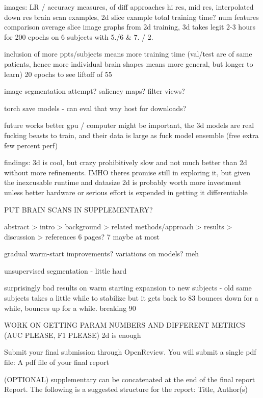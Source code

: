 \documentclass[10pt,twocolumn,letterpaper]{article}
\begin{document}
images:
LR / accuracy measures, of diff approaches
hi res, mid res, interpolated down res brain scan examples,
2d slice example
total training time? num features comparison
average slice image
graphs from 2d training, 3d takes legit 2-3 hours for 200 epochs on 6 subjects with 5./6 & 7. / 2.

inclusion of more ppts/subjects means more training time (val/test are of same patients,
hence more individual brain shapes means more general, but longer to learn)
20 epochs to see liftoff of 55%

image segmentation attempt?
saliency maps?
filter views?

torch save models - can eval that way
host for downloads?

future works
better gpu / computer might be important, the 3d models are real fucking beasts to train, and their data is large as fuck
model ensemble (free extra few percent perf)

findings: 3d is cool, but crazy prohibitively slow and not much better than 2d without more refinements. IMHO theres
promise still in exploring it, but given the inexcusable runtime and datasize 2d is probably worth more investment
unless better hardware or serious effort is expended in getting it differentiable

PUT BRAIN SCANS IN SUPPLEMENTARY?

abstract > intro > background > related
methods/approach > results > discussion > references
6 pages? 7 maybe at most

gradual warm-start improvements?
variations on models? meh

unsupervised segmentation - little hard

surprisingly bad results on warm starting expansion to new subjects - old same subjects takes a little while to stabilize
but it gets back to 83%
bounces down for a while, bounces up for a while. breaking 90%

WORK ON GETTING PARAM NUMBERS AND
DIFFERENT METRICS (AUC PLEASE, F1 PLEASE)
2d is enough

Submit your final submission through OpenReview. You will submit a single pdf file:
A pdf file of your final report

(OPTIONAL) supplementary can be concatenated at the end of the final report
Report. The following is a suggested structure for the report:
Title, Author(s)
\end{document}
